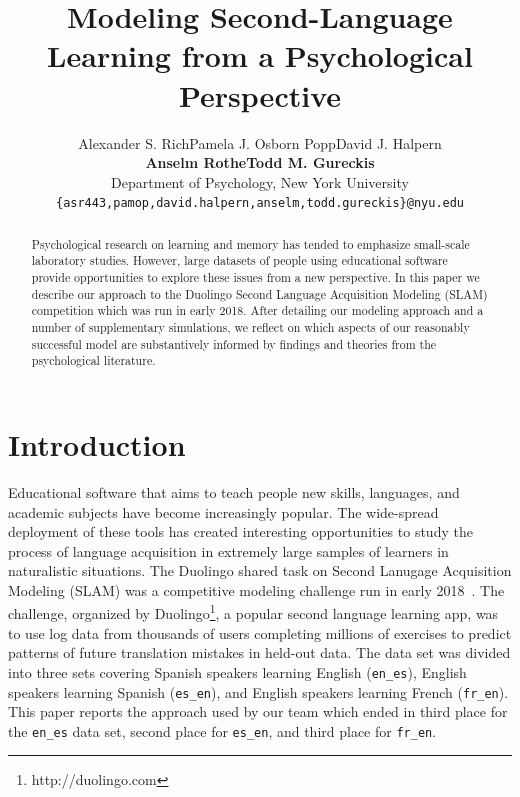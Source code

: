 \documentclass[11pt,a4paper]{article}
\title{Modeling Second-Language Learning from a Psychological Perspective}
\author{Alexander S. Rich\qquad Pamela J. Osborn Popp\qquad David J. Halpern\\
  \textbf{Anselm Rothe\qquad Todd M. Gureckis} \\
  Department of Psychology, New York University \\
  {\tt \{asr443,pamop,david.halpern,anselm,todd.gureckis\}@nyu.edu} \\}
\date{}
\begin{document}
\maketitle
\begin{abstract}
Psychological research on learning and memory
has tended to emphasize small-scale laboratory
studies.  However, large datasets of people using 
educational software provide opportunities to explore
these issues from a new perspective.  In this paper we
describe our approach to the Duolingo Second Language
Acquisition Modeling (SLAM) competition which was run in
early 2018.   After detailing our modeling approach and a number of
supplementary simulations, we
reflect on which aspects of our reasonably
successful model are substantively
informed by findings and theories from the psychological literature.
\end{abstract}

\section{Introduction}

Educational software that aims to teach people new skills, languages, and
academic subjects have become increasingly popular.  The wide-spread
deployment of these tools has created interesting opportunities to study
the process of language acquisition in extremely large samples of learners in naturalistic
situations. The Duolingo shared task on Second Lanugage Acquisition Modeling (SLAM)
was a competitive modeling challenge run in early 2018~\cite{slam18}.
The challenge, organized by Duolingo\footnote{http://duolingo.com}, a popular second
language learning app, was
to use log data from thousands of users completing millions of exercises to 
predict patterns of future translation mistakes in held-out data.  The data set was
divided into three sets covering Spanish speakers learning English ({\tt en\_es}),
English speakers learning Spanish ({\tt es\_en}), and English speakers learning
French ({\tt fr\_en}).
This paper reports the approach used by our team which ended in third place 
for the {\tt en\_es} data set, second place for {\tt es\_en}, and third place
for {\tt fr\_en}.
\end{document}
